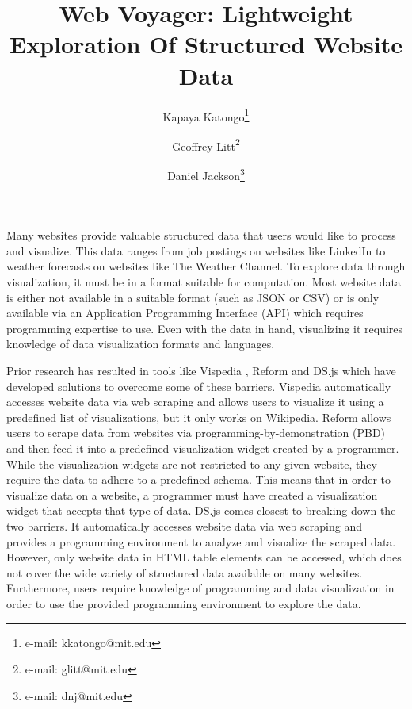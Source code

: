 \documentclass{vgtc}                          %
\title{Web Voyager: Lightweight Exploration Of Structured Website Data}
\author{Kapaya Katongo\thanks{e-mail: kkatongo@mit.edu}
\and Geoffrey Litt\thanks{e-mail: glitt@mit.edu}
\and Daniel Jackson\thanks{e-mail: dnj@mit.edu}}
\affiliation{\scriptsize MIT CSAIL}
\begin{document}

\label{introduction}

\maketitle

Many websites provide valuable structured data that users would like to process and visualize. This data ranges from job postings
on websites like LinkedIn to weather forecasts on websites like The Weather Channel. To explore data through visualization, it must be in a format
suitable for computation. Most website data is either not available in a suitable format (such as JSON or CSV) or is only available
via an Application Programming Interface (API) which requires programming expertise to use. Even with the data in hand,
visualizing it requires knowledge of data visualization formats and languages.

Prior research has resulted in tools like Vispedia \cite{chan2008}, Reform \cite{toomim2009} and DS.js \cite{zhang2017} which have
developed solutions to overcome some of these barriers. Vispedia automatically accesses website data via web scraping and allows users
to visualize it using a predefined list of visualizations, but it only works on Wikipedia. Reform allows users to scrape data from websites via
programming-by-demonstration (PBD) and then feed it into a predefined visualization widget created by a programmer. While the visualization
widgets are not restricted to any given website, they require the data to adhere to a predefined schema. This means that in order to visualize
data on a website, a programmer must have created a visualization widget that accepts that type of data. DS.js comes closest to
breaking down the two barriers. It automatically accesses website data via web scraping and provides a programming environment
to analyze and visualize the scraped data. However, only website data in HTML table elements can be accessed, which does not
cover the wide variety of structured data available on many websites. Furthermore, users require knowledge of programming
and data visualization in order to use the provided programming environment to explore the data.
\end{document}
